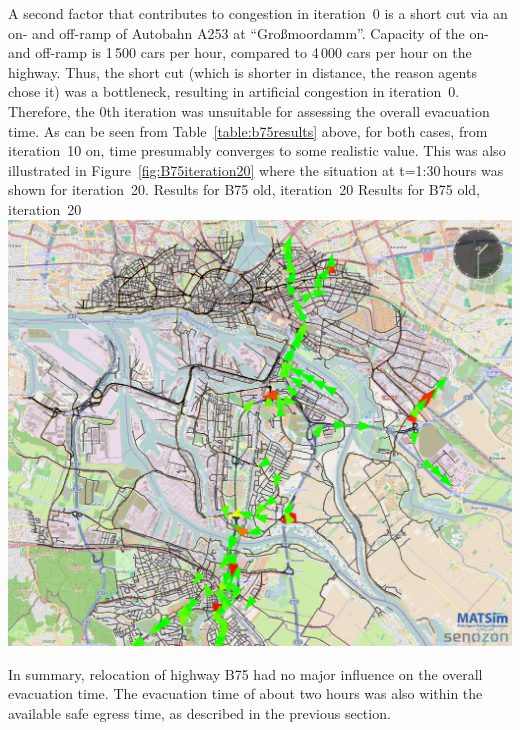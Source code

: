 {}
%
A second factor that contributes to congestion in iteration~0 is a short cut via an on- and off-ramp of Autobahn A253 at ``Gro{\ss}moordamm''. Capacity of the on- and off-ramp is 1\,500 cars per hour, compared to 4\,000 cars per hour on the highway. Thus, the short cut (which is shorter in distance, the reason agents chose it) was a bottleneck, resulting in artificial congestion in iteration~0.
Therefore, the 0th iteration was unsuitable for assessing the overall evacuation time. As can be seen from Table~\ref{table:b75results} above, for both cases, from iteration~10 on, time presumably converges to some realistic value. This was also illustrated in Figure~\ref{fig:B75iteration20} where the situation at t=1:30\,hours was shown for iteration~20.
%
\createfigure%
{Results for B75 old, iteration~20}%
{Results for B75 old, iteration~20}%
{\label{fig:B75iteration20}}%
{\includegraphics[width=0.7\linewidth]{scenarios/figures/B75iteration20}}%
{}

In summary, relocation of highway B75 had no major influence on the overall evacuation time. The evacuation time of about two hours was also within the available safe egress time, as described in the previous section. 

